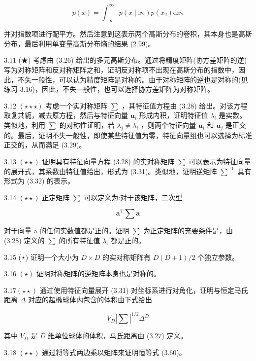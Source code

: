 \documentclass[10pt]{article}
\begin{document}
\[
p\left( x\right)  = {\int }_{-\infty }^{\infty }p\left( {x \mid  {x}_{2}}\right) p\left( {x}_{2}\right) \mathrm{d}{x}_{2} \tag{3.205}
\]

并对指数项进行配平方。然后注意到这表示两个高斯分布的卷积，其本身也是高斯分布，最后利用单变量高斯分布熵的结果 (2.99)。

3.11 (★) 考虑由 (3.26) 给出的多元高斯分布。通过将精度矩阵(协方差矩阵的逆)写为对称矩阵和反对称矩阵之和，证明反对称项不出现在高斯分布的指数中，因此，不失一般性，可以认为精度矩阵是对称的。由于对称矩阵的逆也是对称的(见练习 3.16)，因此，不失一般性，也可以选择协方差矩阵为对称矩阵。

3.12 \(\left( {\star  \star   \star  }\right)\) 考虑一个实对称矩阵 \(\mathbf{\sum }\) ，其特征值方程由 (3.28) 给出。对该方程取复共轭，减去原方程，然后与特征向量 \({\mathbf{u}}_{i}\) 形成内积，证明特征值 \({\lambda }_{i}\) 是实数。类似地，利用 \(\mathbf{\sum }\) 的对称性证明，若 \({\lambda }_{j} \neq  {\lambda }_{i}\) ，则两个特征向量 \({\mathbf{u}}_{i}\) 和 \({\mathbf{u}}_{j}\) 是正交的。最后，证明不失一般性，即使某些特征值为零，特征向量组也可以选择为标准正交的，从而满足 (3.29)。

3.13 \(\left( {\star  \star  }\right)\) 证明具有特征向量方程 (3.28) 的实对称矩阵 \(\mathbf{\sum }\) 可以表示为特征向量的展开式，其系数由特征值给出，形式为 (3.31)。类似地，证明逆矩阵 \({\mathbf{\sum }}^{-1}\) 具有形式为 (3.32) 的表示。

3.14 \(\left( {\star  \star  }\right)\) 正定矩阵 \(\sum\) 可以定义为:对于该矩阵，二次型

\[
{\mathbf{a}}^{\mathrm{T}}\mathbf{\sum }\mathbf{a} \tag{3.206}
\]

对于向量 a 的任何实数值都是正的。证明 \(\mathbf{\sum }\) 为正定矩阵的充要条件是，由 (3.28) 定义的 \(\mathbf{\sum }\) 的所有特征值 \({\lambda }_{i}\) 都是正的。

3.15 (⋆) 证明一个大小为 \(D \times  D\) 的实对称矩阵有 \(D\left( {D + 1}\right) /2\) 个独立参数。

3.16 \(\left( \star \right)\) 证明对称矩阵的逆矩阵本身也是对称的。

\({3.17}\left( {\star  \star  }\right)\) 通过使用特征向量展开 (3.31) 对坐标系进行对角化，证明与恒定马氏距离 \(\Delta\) 对应的超椭球体内包含的体积由下式给出

\[
{V}_{D}{\left| \sum \right| }^{1/2}{\Delta }^{D} \tag{3.207}
\]

其中 \({V}_{D}\) 是 \(D\) 维单位球体的体积，马氏距离由 (3.27) 定义。

3.18 \(\left( {\star  \star  }\right)\) 通过将等式两边乘以矩阵来证明恒等式 (3.60)。
\end{document}
